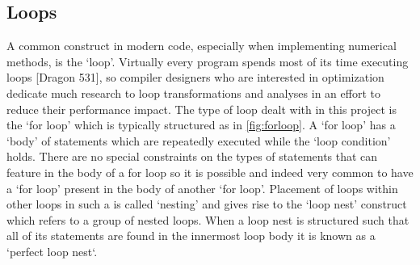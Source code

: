 \documentclass[a4paper,12pt,twoside]{report}
\begin{document}
\subsection*{Loops}
A common construct in modern code, especially when implementing numerical methods, is the `loop'. Virtually every program spends most of its 
time executing loops [Dragon 531], so compiler designers who are interested in optimization dedicate much research to 
loop transformations and analyses in an effort to reduce their performance impact. The type of loop dealt with in this project is the
`for loop' which is typically structured as in \ref{fig:forloop}. A `for loop' has a `body' of statements which are repeatedly executed
while the `loop condition' holds. There are no special constraints on the types of statements that can feature in the body of a for loop so it
is possible and indeed very common to have a `for loop' present in the body of another `for loop'. Placement of loops within other loops in such a 
is called `nesting' and gives rise to the `loop nest' construct which refers to a group of nested loops. When a loop nest is structured
such that all of its statements are found in the innermost loop body it is known as a `perfect loop nest`.
\end{document}
